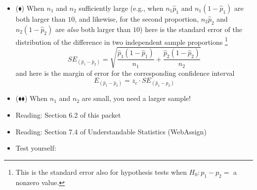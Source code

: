 \documentclass[11pt]{article}
\newcommand{\bd}{$\blacklozenge$}
\newcommand{\dbd}{$\blacklozenge\blacklozenge$}
\begin{document}
\begin{enumerate}[resume]
\begin{enumerate}
    \begin{itemize}
        \item (\bd) When $n_1$ and $n_2$ sufficiently large (e.g., when $n_1\hat{p}_1$ and $n_1(1-\hat{p}_1)$ are both larger than $10$, and likewise, for the second proportion, $n_2\hat{p}_2$ and $n_2(1-\hat{p}_2)$ are \emph{also} both larger than $10$) here is the standard error of the distribution of the difference in two independent sample proportions%
 \footnote{%
This is the standard error also for hypothesis tests when $H_0: p_1 -p_2 =$ a nonzero value.
    }
\[SE_{(\hat{p}_1 - \hat{p}_2)} = \sqrt{\frac{ \hat{p}_1 (1 - \hat{p}_1)}{n_1} + \frac{ \hat{p}_2 (1 - \hat{p}_2)}{n_2} } \]
    and here is the margin of error for the corresponding confidence interval
\[E_{(\hat{p}_1 - \hat{p}_2)} = z_c \cdot SE_{(\hat{p}_1 - \hat{p}_2)}\]
    \item (\dbd) When $n_1$ and $n_2$ are small, you need a larger sample!
    \end{itemize}
\end{enumerate}
\end{enumerate}

{\it
\begin{itemize}
\renewcommand{\labelitemi}{{$\ast$}}
\item Reading: Section 6.2 of this packet
\item Reading: Section 7.4 of Understandable Statistics (WebAssign)
\item Test yourself:
\end{itemize}
}
\end{document}

